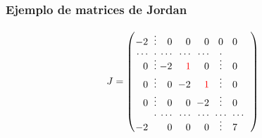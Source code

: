 
\subsection{}

\begin{frame}\frametitle{Ejemplo de matrices de Jordan}
	
	\[
	J = 
	\left(
	\begin{array}{@{\hspace{0.1\tabcolsep}}r@{\hspace{\tabcolsep}}r@{\hspace{0.5\tabcolsep}}r@{\hspace{\tabcolsep}}r@{\hspace{\tabcolsep}}r@{\hspace{\tabcolsep}}c@{\hspace{\tabcolsep}}l@{\hspace{\tabcolsep}}l@{\hspace{0.1\tabcolsep}}}
	-2 & \vdots & 0 & 0 & 0 & 0 & 0\\[0mm]
	\cdots & \cdot & \cdots  & \cdots & \cdots & \cdot & & \\[-2mm]
	0 & \vdots & -2 & {\color{red}1}   & 0 & \vdots  & 0\\[-0mm]
	0 & \vdots & 0  & -2               & {\color{red}1} & \vdots  & 0\\[-0mm]
	0 & \vdots & 0  & 0                & -2 & \vdots  & 0\\[-0mm]
	& \cdot & \cdots  & \cdots & \cdots & \cdots  & \cdots & \\[-2mm]
	-2 &  & 0 & 0 & 0 & \vdots & 7\\[0mm]
	\end{array}
	\right) 	
	\]
	
\end{frame}


\subsection{}

